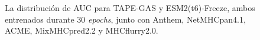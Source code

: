\begin{figure}[h]
	
	
	\caption{
		La distribución de AUC para TAPE-GAS y ESM2(t6)-Freeze, ambos entrenados durante 30 \textit{epochs}, junto con Anthem, NetMHCpan4.1, ACME, MixMHCpred2.2 y MHCflurry2.0.}
	\label{fig:auc_distribution}
\end{figure}

